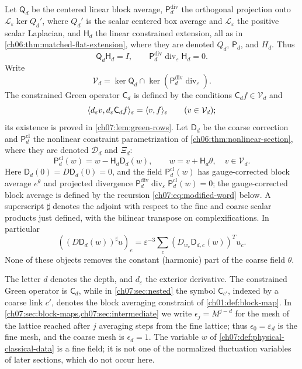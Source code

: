 \begin{definition}
Let $\mathsf Q_d$ be the centered linear block average, $\mathsf P_d^{\mathrm{div}}$ the orthogonal projection onto $\mathscr L_\varepsilon\ker Q_d'$, where $Q_d'$ is the scalar centered box average and $\mathscr L_\varepsilon$ the positive scalar Laplacian, and $\mathsf H_d$ the linear constrained extension, all as in \cref{ch06:thm:matched-flat-extension}, where they are denoted $Q_d$, $\mathsf P_d$, and $H_d$. Thus
\[
 \mathsf Q_d\mathsf H_d=I,\qquad \mathsf P_d^{\mathrm{div}}\operatorname{div}_\varepsilon\mathsf H_d=0.
\]
Write
\[
 \mathcal V_d=\ker\mathsf Q_d\cap\ker(\mathsf P_d^{\mathrm{div}}\operatorname{div}_\varepsilon).
\]
The constrained Green operator $\mathsf C_d$ is defined by the conditions $\mathsf C_df\in\mathcal V_d$ and
\[
 \langle d_\varepsilon v,d_\varepsilon\mathsf C_df\rangle_\varepsilon=\langle v,f\rangle_\varepsilon\qquad(v\in\mathcal V_d);
\]
its existence is proved in \cref{ch07:lem:green-rows}. Let $\mathsf D_d$ be the coarse correction and $\mathsf P_d^{\mathrm{cl}}$ the nonlinear constraint parametrization of \cref{ch06:thm:nonlinear-section}, where they are denoted $\mathscr D_d$ and $\Xi_d$:
\[
 \mathsf P_d^{\mathrm{cl}}(w)=w-\mathsf H_d\mathsf D_d(w),\qquad w=v+\mathsf H_d\theta,\quad v\in\mathcal V_d.
\]
Here $\mathsf D_d(0)=D\mathsf D_d(0)=0$, and the field $\mathsf P_d^{\mathrm{cl}}(w)$ has gauge-corrected block average $e^\theta$ and projected divergence $\mathsf P_d^{\mathrm{div}}\operatorname{div}_\varepsilon\mathsf P_d^{\mathrm{cl}}(w)=0$; the gauge-corrected block average is defined by the recursion \eqref{ch07:eq:modified-word} below. A superscript $\sharp$ denotes the adjoint with respect to the fine and coarse scalar products just defined, with the bilinear transpose on complexifications. In particular
\[
 ((D\mathsf D_d(w))^\sharp u)_e=\varepsilon^{-3}\sum_c(D_{w_e}\mathsf D_{d,c}(w))^Tu_c.
\]
None of these objects removes the constant (harmonic) part of the coarse field $\theta$.
\end{definition}

The letter $d$ denotes the depth, and $d_\varepsilon$ the exterior derivative. The constrained Green operator is $\mathsf C_d$, while in \cref{ch07:sec:nested} the symbol $\mathsf C_{c'}$, indexed by a coarse link $c'$, denotes the block averaging constraint of \cref{ch01:def:block-map}. In \cref{ch07:sec:block-maps,ch07:sec:intermediate} we write $\epsilon_j=M^{j-d}$ for the mesh of the lattice reached after $j$ averaging steps from the fine lattice; thus $\epsilon_0=\varepsilon_d$ is the fine mesh, and the coarse mesh is $\epsilon_d=1$. The variable $w$ of \cref{ch07:def:physical-classical-data} is a fine field; it is not one of the normalized fluctuation variables of later sections, which do not occur here.

